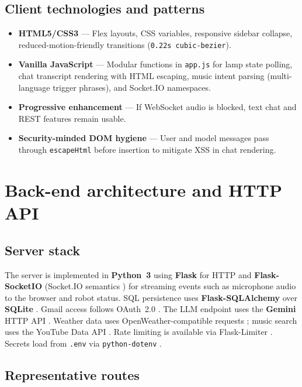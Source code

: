 \documentclass[12pt,a4paper]{report}
\begin{document}
\subsection{Client technologies and patterns}

\begin{itemize}
    \item \textbf{HTML5/CSS3} --- Flex layouts, CSS variables, responsive sidebar collapse, reduced-motion-friendly transitions (\texttt{0.22s cubic-bezier}).
    \item \textbf{Vanilla JavaScript} --- Modular functions in \texttt{app.js} for lamp state polling, chat transcript rendering with HTML escaping, music intent parsing (multi-language trigger phrases), and Socket.IO namespaces.
    \item \textbf{Progressive enhancement} --- If WebSocket audio is blocked, text chat and REST features remain usable.
    \item \textbf{Security-minded DOM hygiene} --- User and model messages pass through \texttt{escapeHtml} before insertion to mitigate XSS in chat rendering.
\end{itemize}

\section{Back-end architecture and HTTP API}

\subsection{Server stack}

The server is implemented in \textbf{Python~3} using \textbf{Flask} \cite{flask} for HTTP and \textbf{Flask-SocketIO} \cite{flask-socketio} (Socket.IO semantics \cite{socketio}) for streaming events such as microphone audio to the browser and robot status. SQL persistence uses \textbf{Flask-SQLAlchemy} \cite{flask-sqlalchemy} over \textbf{SQLite} \cite{sqlite}. Gmail access follows OAuth~2.0 \cite{rfc6749, google-oauth, gmail-api}. The LLM endpoint uses the \textbf{Gemini} HTTP API \cite{gemini-api}. Weather data uses OpenWeather-compatible requests \cite{openweather}; music search uses the YouTube Data API \cite{youtube-api}. Rate limiting is available via Flask-Limiter \cite{flask-limiter}. Secrets load from \texttt{.env} via \texttt{python-dotenv} \cite{python-dotenv}.

\subsection{Representative routes}
\end{document}
